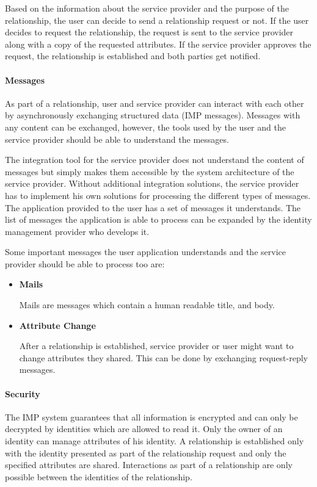 Based on the information about the service provider and the purpose of the relationship, the user can decide to send a relationship request or not. If the user decides to request the relationship, the request is sent to the service provider along with a copy of the requested attributes. If the service provider approves the request, the relationship is established and both parties get notified.

\paragraph{Messages} As part of a relationship, user and service provider can interact with each other by asynchronously exchanging structured data (IMP messages). Messages with any content can be exchanged, however, the tools used by the user and the service provider should be able to understand the messages.

The integration tool for the service provider does not understand the content of messages but simply makes them accessible by the system architecture of the service provider. Without additional integration solutions, the service provider has to implement his own solutions for processing the different types of messages. The application provided to the user has a set of messages it understands. The list of messages the application is able to process can be expanded by the identity management provider who develops it.

Some important messages the user application understands and the service provider should be able to process too are:

\begin{itemize}
    \item \textbf{Mails}
    
    Mails are messages which contain a human readable title, and body.
    
    \item \textbf{Attribute Change}
    
    After a relationship is established, service provider or user might want to change attributes they shared. This can be done by exchanging request-reply messages.
\end{itemize}

\paragraph{Security}
The IMP system guarantees that all information is encrypted and can only be decrypted by identities which are allowed to read it. Only the owner of an identity can manage attributes of his identity. A relationship is established only with the identity presented as part of the relationship request and only the specified attributes are shared. Interactions as part of a relationship are only possible between the identities of the relationship. 

